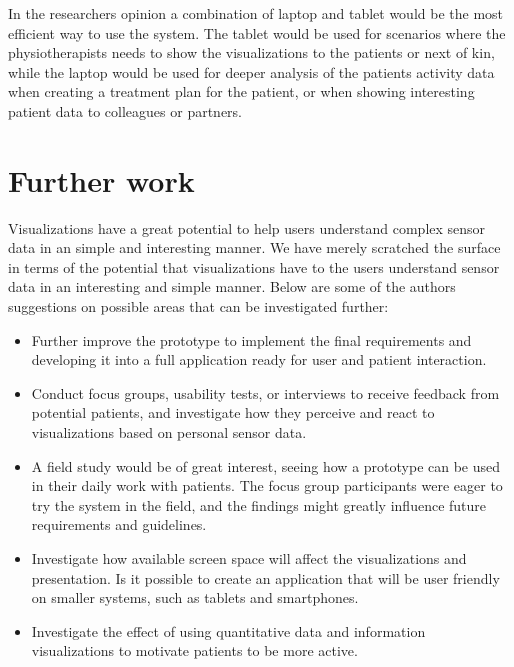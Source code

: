In the researchers opinion a combination of laptop and tablet would be the most efficient way to use the system. The tablet would be used for scenarios where the physiotherapists needs to show the visualizations to the patients or next of kin, while the laptop would be used for deeper analysis of the patients activity data when creating a treatment plan for the patient, or when showing interesting patient data to colleagues or partners.

\section{Further work}
Visualizations have a great potential to help users understand complex sensor data in an simple and interesting manner.
We have merely scratched the surface in terms of the potential that visualizations have to  the users understand sensor data in an interesting and simple manner. Below are some of the authors suggestions on possible areas that can be investigated further:

\begin{itemize}
  \item Further improve the  prototype to implement the final requirements and developing it into a full application ready for user and patient interaction.
  \item Conduct focus groups, usability tests, or interviews to receive feedback from potential patients, and investigate how they perceive and react to visualizations based on personal sensor data.
  \item A field study would be of great interest, seeing how a prototype can be used in their daily work with patients. The focus group participants were eager to try the system in the field, and the findings might greatly influence future requirements and guidelines.
  \item Investigate how available screen space will affect the visualizations and presentation. Is it possible to create an application that will be user friendly on smaller systems, such as tablets and smartphones.
  \item Investigate the effect of using quantitative data and information visualizations to motivate patients to be more active.
\end{itemize}


